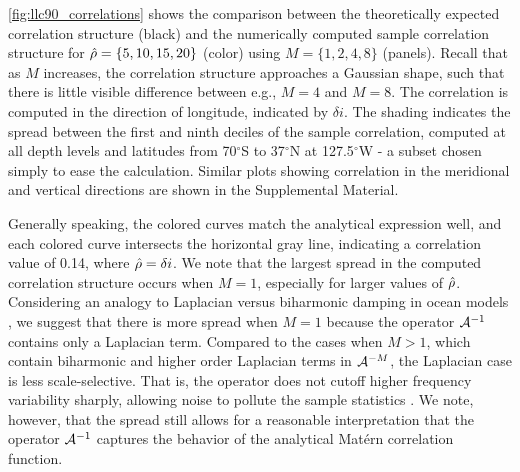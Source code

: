 \cref{fig:llc90_correlations} shows the comparison between the theoretically
expected correlation structure (black) and the numerically computed sample
correlation structure for
$\hat{\rho} = \{5, 10, 15, 20\}$ (color) using $M =\{1,2,4,8\}$ (panels).
Recall that as $M$ increases, the correlation structure approaches a Gaussian
shape, such that there is little visible difference between e.g., $M=4$ and
$M=8$.
The correlation is computed in the direction of longitude, indicated by
$\delta i$.
The shading indicates the spread between the first and ninth deciles of the
sample correlation, computed at all depth levels and latitudes from
70$^\circ$S to 37$^\circ$N at 127.5$^\circ$W - a subset chosen simply to ease the
calculation.
Similar plots showing correlation in the meridional and vertical directions are
shown in the Supplemental Material.

Generally speaking, the colored curves match the analytical expression well, and
each colored curve intersects the horizontal gray line, indicating a correlation
value of 0.14, where $\hat{\rho} = \delta i$.
We note that the largest spread in the computed correlation structure occurs
when $M=1$, especially for larger values of $\hat{\rho}$.
Considering an analogy to Laplacian versus biharmonic damping in ocean models
\citep[e.g.,][]{holland_role_1978,griffies_biharmonic_2000}, we suggest that
there is more spread when $M=1$ because the operator $\mathcal{A}^{-1}$
contains only a Laplacian term.
Compared to the cases when $M>1$, which contain biharmonic and higher order
Laplacian terms in $\mathcal{A}^{-M}$, the Laplacian case is less
scale-selective.
That is, the operator does not cutoff higher frequency variability sharply,
allowing noise to pollute the sample statistics \citep[see][Section 2 for a quantitative
description of this cutoff in frequency space]{griffies_biharmonic_2000}.
We note, however, that the spread still allows for a reasonable interpretation
that the operator $\mathcal{A}^{-1}$ captures the behavior of the analytical Mat\'ern correlation
function.

